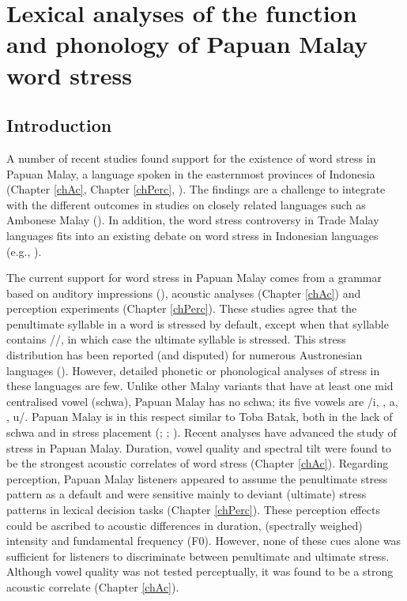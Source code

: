 \chapter{Lexical analyses of the function and phonology of Papuan Malay word stress} \label{chLex}

\section{Introduction} \label{sec41}
A number of recent studies found support for the existence of word stress in Papuan Malay, a language spoken in the easternmost provinces of Indonesia (Chapter \ref{chAc}, Chapter \ref{chPerc}, \citealt{kluge_grammar_2017}). The findings are a challenge to integrate with the different outcomes in studies on closely related languages such as Ambonese Malay (\citealt{maskikit-essed_no_2016}). In addition, the word stress controversy in Trade Malay languages fits into an existing debate on word stress in Indonesian languages (e.g., \citealt{vanzanten_stress_2010}).\par

The current support for word stress in Papuan Malay comes from a grammar based on auditory impressions (\citealt{kluge_grammar_2017}), acoustic analyses (Chapter \ref{chAc}) and perception experiments (Chapter \ref{chPerc}). These studies agree that the penultimate syllable in a word is stressed by default, except when that syllable contains //, in which case the ultimate syllable is stressed. This stress distribution has been reported (and disputed) for numerous Austronesian languages (\citealt{vanzanten_stress_2010}). However, detailed phonetic or phonological analyses of stress in these languages are few. Unlike other Malay variants that have at least one mid centralised vowel (schwa), Papuan Malay has no schwa; its five vowels are /i, , a, , u/. Papuan Malay is in this respect similar to Toba Batak, both in the lack of schwa and in stress placement (\citealt{goedemans_stress_2007}; \citealt{vanheuven_effects_1997}; \citealt{vanzanten_indonesian_1984}). Recent analyses have advanced the study of stress in Papuan Malay. Duration, vowel quality and spectral tilt were found to be the strongest acoustic correlates of word stress (Chapter \ref{chAc}). Regarding perception, Papuan Malay listeners appeared to assume the penultimate stress pattern as a default and were sensitive mainly to deviant (ultimate) stress patterns in lexical decision tasks (Chapter \ref{chPerc}). These perception effects could be ascribed to acoustic differences in duration, (spectrally weighed) intensity and fundamental frequency (F0). However, none of these cues alone was sufficient for listeners to discriminate between penultimate and ultimate stress. Although vowel quality was not tested perceptually, it was found to be a strong acoustic correlate (Chapter \ref{chAc}).\par

